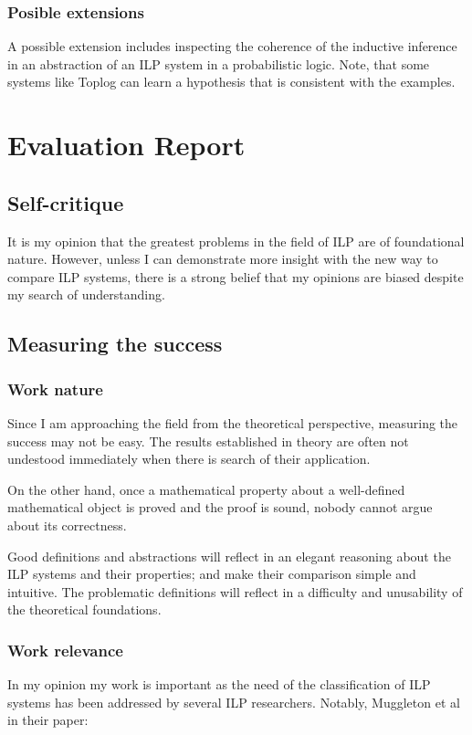 \subsection{Posible extensions}
A possible extension includes inspecting the coherence of the inductive inference in an abstraction of an ILP system in a probabilistic logic. Note, that some systems like Toplog can learn a hypothesis that is consistent with the examples.

\chapter{Evaluation Report}

\section{Self-critique}
It is my opinion that the greatest problems in the field of ILP are of foundational nature. However, unless I can demonstrate more insight with the new way to compare ILP systems, there is a strong belief that my opinions are biased despite my search of understanding.
\section{Measuring the success}

\subsection{Work nature}
Since I am approaching the field from the theoretical perspective, measuring the success may not be easy. The results established in theory are often not undestood immediately when there is search of their application.

On the other hand, once a mathematical property about a well-defined mathematical object is proved and the proof is sound, nobody cannot argue about its correctness.

Good definitions and abstractions will reflect in an elegant reasoning about the ILP systems and their properties; and make their comparison simple and intuitive. The problematic definitions will reflect in a difficulty and unusability of the theoretical foundations.

\subsection{Work relevance}
In my opinion my work is important as the need of the classification of ILP systems has been addressed by several ILP researchers. Notably, Muggleton et al in their paper:

